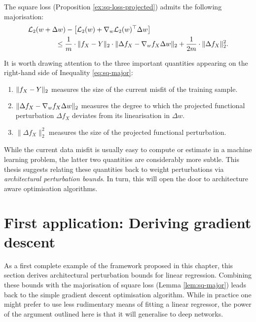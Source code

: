 \begin{refsection}
\begin{lemma}\label{lem:sq-major} The square loss (Proposition \ref{ex:sq-loss-projected}) admits the following majorisation:
    \begin{align}\label{eq:sq-major}
        &\mathcal{L}_2(w+\Delta w) -\left[ \mathcal{L}_2(w) + \nabla_w\mathcal{L}_2(w)^\top \Delta w\right] \nonumber \\
        &\qquad\qquad\leq \frac{1}{m}\cdot \Vert {f_X-Y} \Vert_2\cdot\Vert {\Delta f_X - \nabla_w f_X \Delta w} \Vert_2 + \frac{1}{2m} \cdot \|\Delta f_X\|_2^2.
    \end{align}
\end{lemma}
It is worth drawing attention to the three important quantities appearing on the right-hand side of Inequality \ref{eq:sq-major}:
\begin{enumerate}
    \item $\Vert {f_X-Y} \Vert_2$ measures the size of the current misfit of the training sample.
    \item $\Vert {\Delta f_X - \nabla_w f_X \Delta w} \Vert_2$ measures the degree to which the projected functional perturbation $\Delta f_X$ deviates from its linearisation in $\Delta w$.
    \item $\|\Delta f_X\|_2^2$ measures the size of the projected functional perturbation.
\end{enumerate}

While the current data misfit is usually easy to compute or estimate in a machine learning problem, the latter two quantities are considerably more subtle. This thesis suggests relating these quantities back to weight perturbations via \textit{architectural perturbation bounds}. In turn, this will open the door to architecture aware optimisation algorithms.

\section{First application: Deriving gradient descent}

As a first complete example of the framework proposed in this chapter, this section derives architectural perturbation bounds for linear regression. Combining these bounds with the majorisation of square loss (Lemma \ref{lem:sq-major}) leads back to the simple gradient descent optimisation algorithm. While in practice one might prefer to use less rudimentary means of fitting a linear regressor, the power of the argument outlined here is that it will generalise to deep networks.


\end{refsection}
